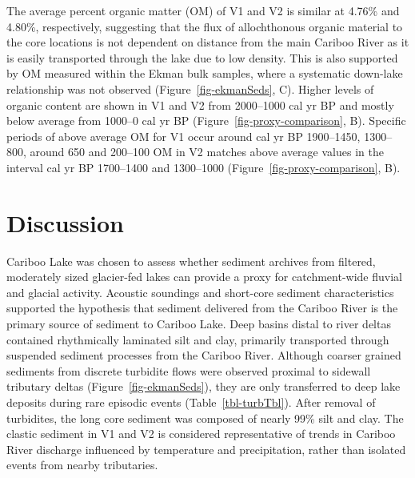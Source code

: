 \documentclass[
  letterpaper,
  DIV=11,
  numbers=noendperiod]{scrartcl}
\begin{document}
The average percent organic matter (OM) of V1 and V2 is similar at
4.76\% and 4.80\%, respectively, suggesting that the flux of
allochthonous organic material to the core locations is not dependent on
distance from the main Cariboo River as it is easily transported through
the lake due to low density. This is also supported by OM measured
within the Ekman bulk samples, where a systematic down-lake relationship
was not observed (Figure~\ref{fig-ekmanSeds}, C). Higher levels of
organic content are shown in V1 and V2 from 2000--1000 cal yr BP and
mostly below average from 1000--0 cal yr BP
(Figure~\ref{fig-proxy-comparison}, B). Specific periods of above
average OM for V1 occur around cal yr BP 1900--1450, 1300--800, around
650 and 200--100 OM in V2 matches above average values in the interval
cal yr BP 1700--1400 and 1300--1000 (Figure~\ref{fig-proxy-comparison},
B).

\section{Discussion}\label{discussion}

Cariboo Lake was chosen to assess whether sediment archives from
filtered, moderately sized glacier-fed lakes can provide a proxy for
catchment-wide fluvial and glacial activity. Acoustic soundings and
short-core sediment characteristics supported the hypothesis that
sediment delivered from the Cariboo River is the primary source of
sediment to Cariboo Lake. Deep basins distal to river deltas contained
rhythmically laminated silt and clay, primarily transported through
suspended sediment processes from the Cariboo River. Although coarser
grained sediments from discrete turbidite flows were observed proximal
to sidewall tributary deltas (Figure~\ref{fig-ekmanSeds}), they are only
transferred to deep lake deposits during rare episodic events
(Table~\ref{tbl-turbTbl}). After removal of turbidites, the long core
sediment was composed of nearly 99\% silt and clay. The clastic sediment
in V1 and V2 is considered representative of trends in Cariboo River
discharge influenced by temperature and precipitation, rather than
isolated events from nearby tributaries.
\end{document}
